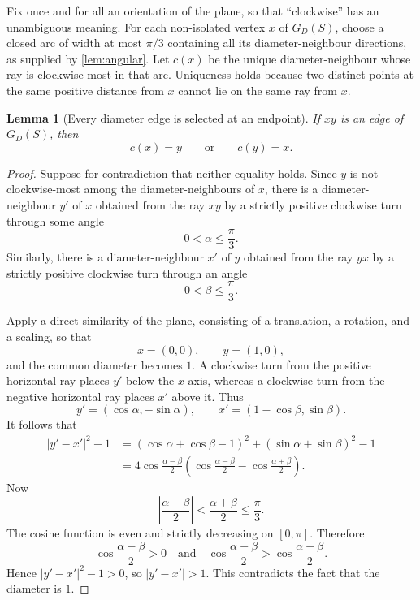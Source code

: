 \documentclass[11pt]{article}
\newtheorem{lemma}[lemma]{Lemma}
\theoremstyle{definition}
\theoremstyle{remark}
\begin{document}
Fix once and for all an orientation of the plane, so that ``clockwise'' has an unambiguous meaning.  For each non-isolated vertex $x$ of $G_D(S)$, choose a closed arc of width at most $\pi/3$ containing all its diameter-neighbour directions, as supplied by \cref{lem:angular}.  Let $c(x)$ be the unique diameter-neighbour whose ray is clockwise-most in that arc.  Uniqueness holds because two distinct points at the same positive distance from $x$ cannot lie on the same ray from $x$.

\begin{lemma}[Every diameter edge is selected at an endpoint]\label{lem:selected}
If $xy$ is an edge of $G_D(S)$, then
\[
 c(x)=y\qquad\text{or}\qquad c(y)=x.
\]
\end{lemma}

\begin{proof}
Suppose for contradiction that neither equality holds.  Since $y$ is not clockwise-most among the diameter-neighbours of $x$, there is a diameter-neighbour $y'$ of $x$ obtained from the ray $xy$ by a strictly positive clockwise turn through some angle
\[
 0<\alpha\le\frac{\pi}{3}.
\]
Similarly, there is a diameter-neighbour $x'$ of $y$ obtained from the ray $yx$ by a strictly positive clockwise turn through an angle
\[
 0<\beta\le\frac{\pi}{3}.
\]

Apply a direct similarity of the plane, consisting of a translation, a rotation, and a scaling, so that
\[
 x=(0,0),\qquad y=(1,0),
\]
and the common diameter becomes $1$.  A clockwise turn from the positive horizontal ray places $y'$ below the $x$-axis, whereas a clockwise turn from the negative horizontal ray places $x'$ above it.  Thus
\[
 y'=(\cos\alpha,-\sin\alpha),
 \qquad
 x'=(1-\cos\beta,\sin\beta).
\]
It follows that
\begin{align*}
 |y'-x'|^2-1
 &= (\cos\alpha+\cos\beta-1)^2
    +(\sin\alpha+\sin\beta)^2-1\\
 &=4\cos\frac{\alpha-\beta}{2}
   \left(\cos\frac{\alpha-\beta}{2}
      -\cos\frac{\alpha+\beta}{2}
   \right).
\end{align*}
Now
\[
 \left|\frac{\alpha-\beta}{2}\right|
 <\frac{\alpha+\beta}{2}\le\frac{\pi}{3}.
\]
The cosine function is even and strictly decreasing on $[0,\pi]$.  Therefore
\[
 \cos\frac{\alpha-\beta}{2}>0
 \quad\text{and}\quad
 \cos\frac{\alpha-\beta}{2}
 >\cos\frac{\alpha+\beta}{2}.
\]
Hence $|y'-x'|^2-1>0$, so $|y'-x'|>1$.  This contradicts the fact that the diameter is $1$.
\end{proof}
\end{document}
